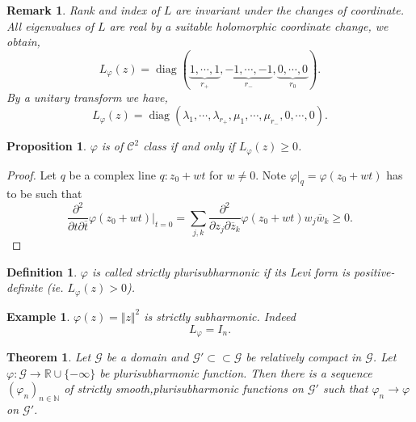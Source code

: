 \documentclass{article}
\newtheorem{theorem}{Theorem} [section]
\newtheorem{proposition}{Proposition}[section]
\newtheorem{definition}{Definition}[section]
\newtheorem{remark}{Remark}[section]
\newtheorem{example}{Example}[section]
\DeclareMathOperator{\diag}{diag}
\newcommand{\norm}[1]{\Vert #1 \Vert}
\newcommand{\N}[0]{\mathbb{N}}
\newcommand{\R}[0]{\mathbb{R}}
\newcommand{\G}[0]{\mathcal{G}}
\begin{document}
\begin{remark}
  Rank and index of $L$ are invariant under the changes of coordinate. All eigenvalues of $L$ are real by a suitable holomorphic coordinate change, we obtain,
  \begin{equation*}
    L_\varphi(z) = \diag(\underbrace{1,\cdots,1}_{r_+},\underbrace{-1,\cdots,-1}_{r_-},\underbrace{0,\cdots,0}_{r_0}).
  \end{equation*}
  By a unitary transform we have,
  \begin{equation*}
    L_\varphi(z) = \diag(\lambda_1,\cdots,\lambda_{r_+},\mu_1,\cdots,\mu_{r_-},0,\cdots,0).
  \end{equation*}
\end{remark}

\begin{proposition}
  $\varphi$ is of $\mathcal{C}^2$ class if and only if $L_\varphi(z)\geq0$.
\end{proposition}

\begin{proof}
  Let $q$ be a complex line $q:z_0+wt$ for $w\not=0$. Note $\varphi|_q = \varphi(z_0+wt)$ has to be such that 
  \begin{equation*}
    {\frac {\partial^2} {\partial t\partial\overline{t}}}\varphi(z_0+wt)|_{t=0} = \sum_{j,k}{\frac {\partial^2} {\partial z_j\partial \overline{z}_k}}\varphi(z_0+wt)w_j\overline{w}_k\geq0.
  \end{equation*}
\end{proof}

\begin{definition}
  $\varphi$ is called strictly plurisubharmonic if its Levi form is positive-definite (ie. $L_\varphi(z)>0$).
\end{definition}

\begin{example}
  $\varphi(z) = \norm{z}^2$ is strictly subharmonic. Indeed 
  \begin{equation*}
    L_\varphi = I_n.
  \end{equation*}
\end{example}

\begin{theorem}
  Let $\G$ be a domain and $\G'\subset\subset\G$ be relatively compact in $\G$. Let $\varphi:\G\to\R\cup\{-\infty\}$ be plurisubharmonic function. Then there is a sequence $(\varphi_n)_{n\in\N}$ of strictly smooth,plurisubharmonic functions on $\G'$ such that $\varphi_n\to\varphi$ on $\G'$. 
\end{theorem}
\end{document}
